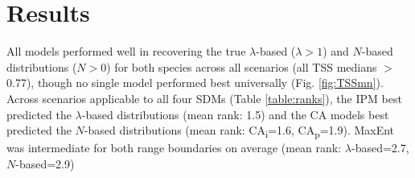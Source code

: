 \documentclass[preprint,review,times,12pt]{elsarticle}
\begin{document}
\section{Results}
\label{S:3}


All models performed well in recovering the true $\lambda$-based ($\lambda > 1$) and $N$-based distributions ($N>0$) for both species across all scenarios (all TSS medians $>$ 0.77), though no single model performed best universally (Fig. \ref{fig:TSSmn}). Across scenarios applicable to all four SDMs (Table \ref{table:ranks}), the IPM best predicted the $\lambda$-based distributions (mean rank: 1.5) and the CA models best predicted the $N$-based distributions (mean rank: CA\textsubscript{i}=1.6, CA\textsubscript{p}=1.9). MaxEnt was intermediate for both range boundaries on average (mean rank: $\lambda$-based=2.7, $N$-based=2.9)
\end{document}
